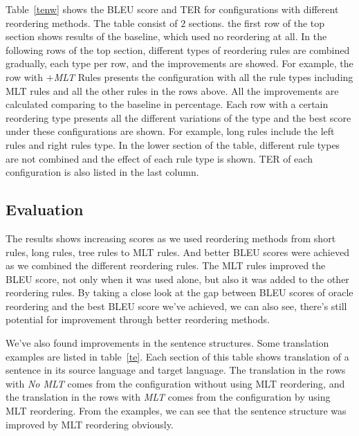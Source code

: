 Table~\ref{tenw} shows the \ac{BLEU} score and \ac{TER} for configurations with different reordering methods. The table consist of $2$ sections. the first row of the top section shows results of the baseline, which used no reordering at all. In the following rows of the top section, different types of reordering rules are combined gradually, each type per row, and the improvements are showed. For example, the row with \emph{$+$MLT} Rules presents the configuration with all the rule types including \ac{MLT} rules and all the other rules in the rows above. All the improvements are calculated comparing to the baseline in percentage. Each row with a certain reordering type presents all the different variations of the type and the best score under these configurations are shown. For example, long rules include the left rules and right rules type. In the lower section of the table, different rule types are not combined and the effect of each rule type is shown. \ac{TER} of each configuration is also listed in the last column. %

\subsection{Evaluation}

The results shows increasing scores as we used reordering methods from short rules, long rules, tree rules to \ac{MLT} rules. And better \ac{BLEU} scores were achieved as we combined the different reordering rules. The \ac{MLT} rules improved the \ac{BLEU} score, not only when it was used alone, but also it was added to the other reordering rules. 
By taking a close look at the gap between \ac{BLEU} scores of oracle reordering and the best \ac{BLEU} score we've achieved, we can also see, there's still potential for improvement through better reordering methods.

We've also found improvements in the sentence structures. Some translation examples are listed in table~\ref{te}. Each section of this table shows translation of a sentence in its source language and target language. The translation in the rows with \emph{No MLT} comes from the configuration without using \ac{MLT} reordering, and the translation in the rows with \emph{MLT} comes from the configuration by using \ac{MLT} reordering. From the examples, we can see that the sentence structure was improved by \ac{MLT} reordering obviously.


